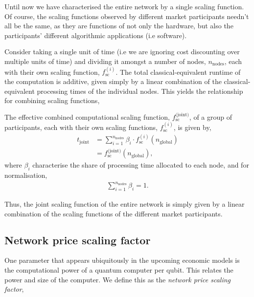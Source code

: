 Until now we have characterised the entire network by a single scaling function. Of course, the scaling functions observed by different market participants needn't all be the same, as they are functions of not only the hardware, but also the participants' different algorithmic applications (i.e software).

Consider taking a single unit of time (i.e we are ignoring cost discounting over multiple units of time) and dividing it amongst a number of nodes, $n_\text{nodes}$, each with their own scaling function, $f_\text{sc}^{(i)}$. The total classical-equivalent runtime of the computation is additive, given simply by a linear combination of the classical-equivalent processing times of the individual nodes. This yields the relationship for combining scaling functions,
\begin{definition}\label{def:comb_sc_func}
The effective combined computational scaling function, $f_\text{sc}^\text{(joint)}$, of a group of participants, each with their own scaling functions, $f_\text{sc}^{(i)}$, is given by,
\begin{align}
	t_\text{joint} &= \sum_{i=1}^{n_{\text{nodes}}} \beta_i \cdot f_\text{sc}^{(i)}(n_\text{global}) \nonumber \\
	&= f_\text{sc}^\text{(joint)}(n_\text{global}),
\end{align}
where $\beta_i$ characterise the share of processing time allocated to each node, and for normalisation,
\begin{align}
\sum_{i=1}^{n_\text{nodes}} \beta_i = 1.
\end{align}

\end{definition}

Thus, the joint scaling function of the entire network is simply given by a linear combination of the scaling functions of the different market participants.

%
%

\subsection{Network price scaling factor}\label{sec:NPSF}

One parameter that appears ubiquitously in the upcoming economic models is the computational power of a quantum computer per qubit. This relates the power and size of the computer. We define this as the \textit{network price scaling factor},

